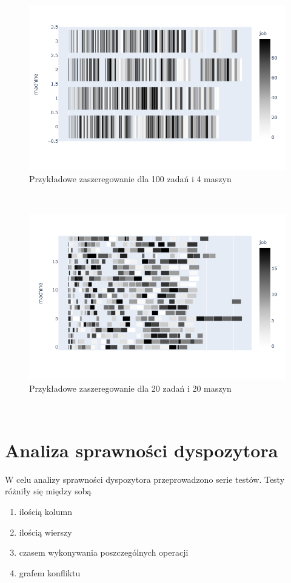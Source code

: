 \documentclass[brudnopis]{xmgr}
\begin{document}
\begin{figure}[!tbh]
\centering
\includegraphics[width=.8\hsize]{fig/newplot_trim100j4m.png}
\caption{Przykładowe zaszeregowanie dla 100 zadań i 4 maszyn\label{diag:sched_100j4m}}
\end{figure}
\medskip\\

\begin{figure}[!tbh]
\centering
\includegraphics[width=.8\hsize]{fig/newplot_trim20j20m.png}
\caption{Przykładowe zaszeregowanie dla 20 zadań i 20 maszyn\label{diag:sched_20j420}}
\end{figure}
\medskip\\

\chapter{Analiza sprawności dyspozytora}

W celu analizy sprawności dyspozytora przeprowadzono serie testów.
Testy różniły się między sobą
\begin{enumerate}
    \item ilością kolumn
    \item ilością wierszy
    \item czasem wykonywania poszczególnych operacji
    \item grafem konfliktu
\end{enumerate}
\end{document}
